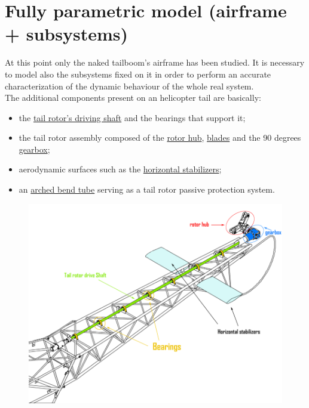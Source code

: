 \clearpage
\section{Fully parametric model (airframe + subsystems)}
\noindent
At this point only the naked tailboom's airframe has been studied. It is necessary to model also the subsystems fixed on it in order to perform an accurate characterization of the dynamic behaviour of the whole real system. \\
The additional components present on an helicopter tail are basically:
\begin{itemize}
	\item the \underline{tail rotor's driving shaft} and the bearings that support it;
	\item the tail rotor assembly composed of the \underline{rotor hub}, \underline{blades} and the 90 degrees \underline{gearbox};
	\item aerodynamic surfaces such as the \underline{horizontal stabilizers};
	\item an \underline{arched bend tube} serving as a tail rotor passive protection system.
\end{itemize}



\smallskip
\begin{figure}[h!]
	\begin{center}
		\centering  		 		
		\includegraphics[width=1\linewidth]{PICTURES/2_Lama_truss/PNG/model2/tail_complete_2.png}
	\end{center}
\end{figure}	


